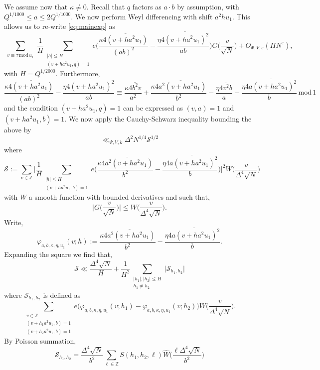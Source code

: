 \documentclass[12pt,reqno]{amsart}
\theoremstyle{plain}
\numberwithin{equation}{section}
\numberwithin{figure}{section}
\theoremstyle{plain}
\theoremstyle{definition}
\theoremstyle{remark}
\newcommand{\mmod}{\,\mathrm{mod}\,}
\begin{document}
We assume now that $\kappa \neq 0$. Recall that $q$ factors as $a \cdot b$ by assumption, with $Q^{1/1000} \leq a \leq 2 Q^{1/1000}$. We now perform Weyl differencing with shift $a^2 h u_1$. This allows us to re-write \eqref{eq:mainexp} as
$$
\sum_{\substack{v \equiv \tau \mmod{u_1}}} \frac{1}{H} \sum_{\substack{|h| \leq H \\ (v + h a^2 u_1, q) = 1}} e \Big ( \frac{\kappa \overline{4 (v + h a^2 u_1)}}{(a b)^2} - \frac{\eta \overline{4 (v + h a^2 u_1)^2}}{a b} \Big ) 
G \Big ( \frac{v}{\sqrt{N}} \Big ) + O_{\Phi, V, \varepsilon}(H N^{\varepsilon}),
$$
with $H = Q^{1/2000}$. 
Furthermore, 
$$
\frac{\kappa \overline{4 (v + h a^2 u_1)}}{(a b)^2} - \frac{\eta \overline{4 (v + h a^2 u_1)^2}}{a b} \equiv \frac{\kappa \overline{4 b^2 v}}{a^2} + \frac{\kappa \overline{4 a^2 (v + h a^2 u_1)}}{b^2} - \frac{\eta \overline{4 v^2 b}}{a} - \frac{\eta \overline{4 a (v + h a^2 u_1)^2}}{b}
\mmod 1
$$
and the condition $(v + h a^2 u_1, q) = 1$ can be expressed as $(v, a) = 1$ and $(v + h a^2 u_1, b) = 1$. 
We now apply the Cauchy-Schwarz 
inequality
bounding the above by
$$\ll_{\Psi, V,k } \Delta^2 N^{1/4} \mathcal{S}^{1/2} 
$$
where
$$
\mathcal{S} := \sum_{v \in \mathbb{Z}} \Big | \frac{1}{H} \sum_{\substack{|h| \leq H \\ (v + h a^2 u_1, b) = 1}} e \Big ( \frac{\kappa \overline{4 a^2 (v + h a^2 u_1)}}{b^2} - \frac{\eta \overline{4 a (v + h a^2 u_1)^2}}{b} \Big ) \Big |^2 W \Big ( \frac{v}{\Delta^4 \sqrt{N}} \Big )
$$
with $W$ a smooth function with bounded derivatives and such that, 
$$
\Big |G \Big ( \frac{v}{\sqrt{N}} \Big) \Big | \leq W \Big ( \frac{v}{\Delta^4 \sqrt{N}} \Big ).
$$
Write, 
$$
\varphi_{a,b, \kappa, \eta, u_1}(v; h) := \frac{\kappa \overline{4 a^2 (v + h a^2 u_1)}}{b^2} - \frac{\eta \overline{4 a (v + h a^2 u_1)^2}}{b}.
$$
Expanding the square we find that, 
$$
\mathcal{S} \ll \frac{\Delta^4 \sqrt{N}}{H} + \frac{1}{H^2} \sum_{\substack{|h_1|, |h_2| \leq H \\ h_1 \neq h_2}} \Big | \mathcal{S}_{h_1, h_2} \Big |
$$
where $\mathcal{S}_{h_1, h_2}$ is defined as
$$
\sum_{\substack{v \in \mathbb{Z} \\ (v + h_1 a^2 u_1, b) = 1 \\ (v + h_2 a^2 u_1, b) = 1}} e \Big ( \varphi_{a,b,\kappa,\eta, u_1}(v; h_1) - \varphi_{a,b,\kappa,\eta, u_1}(v; h_2) \Big ) W \Big ( \frac{v}{\Delta^4 \sqrt{N}} \Big ).
$$
By Poisson summation, 
\begin{equation} \label{eq:poisson201}
\mathcal{S}_{h_1, h_2} = \frac{\Delta^4 \sqrt{N}}{b^2}\sum_{\ell \in \mathbb{Z}} S(h_1, h_2, \ell) \widehat{W} \Big ( \frac{\ell \Delta^4 \sqrt{N}}{b^2} \Big )
\end{equation}
\end{document}
